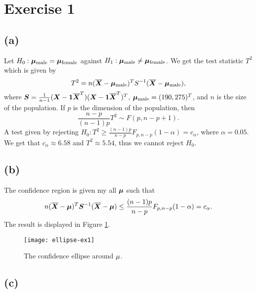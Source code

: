 \section*{Exercise 1}

\subsection*{(a)}
\label{sec:a}

Let $H_0: \bm{\mu}_{\rm  male} = \bm{\mu}_{\rm female}$ against $H_{1}: \bm{\mu}_{\rm
  male} \neq \bm{\mu}_{\rm female}$.
We get the test statistic $T^{2}$ which is given by
\begin{equation*}
  T^{2} = n(\overline{\bm{X}} - \bm{\mu}_{\rm male})^{T} S^{-1}(\overline{\bm{X}} - \bm{\mu}_{\rm male}),
\end{equation*}
where $\bm{S} = \frac{1}{n-1}(\bm{X} - \bm{1}\overline{\bm{X}}^{T})(\bm{X} - \bm{1}\overline{\bm{X}}^{T})^{T}$, $\bm{\mu}_{\rm male} = (190, 275)^{T}$, and $n$ is the size
of the population. If $p$ is the dimension of the population, then 
\begin{equation*}
  \frac{n-p}{(n-1)p}T^{2} \sim F(p,n-p+1).
\end{equation*}
A test given by rejecting $H_{0}: T^{2} \geq \frac{(n-1)p}{n-p}F_{p,
  n-p}(1 -\alpha) = c_{\alpha}$, where $\alpha = 0.05$. We get that
$c_{\alpha} \approx 6.58$ and $T^{2} \approx 5.54
$, thus we cannot reject $H_{0}$.


\subsection*{(b)}
\label{sec:b}

The confidence region is given my all $\bm{\mu}$ such that
\begin{equation*}
  n(\overline{\bm{X}} - \bm{\mu})^{T}\bm{S}^{-1}(\overline{\bm{X}} - \bm{\mu}) \leq \frac{(n-1)p}{n-p}F_{p,
  n-p}(1 -\alpha) = c_{\alpha}.
\end{equation*}
The result is displayed in Figure \ref{fig:ex1-ellipse}.
\begin{figure}[h]
  \centering
  \texttt{[image: ellipse-ex1]}
  \caption{The confidence ellipse around ${\bf \mu}$.}
  \label{fig:ex1-ellipse}
\end{figure}

\subsection*{(c)}
\label{sec:c}

